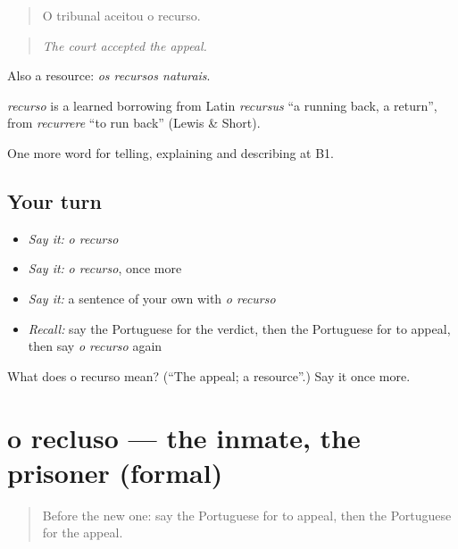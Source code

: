\begin{quote}
O tribunal aceitou o recurso.
\end{quote}

\begin{quote}
\emph{The court accepted the appeal.}
\end{quote}

Also a resource: \emph{os recursos naturais}.

\begin{cousinweb}
\emph{recurso} is a learned borrowing from Latin \emph{recursus} \textquotedblleft{}a running back, a return\textquotedblright{}, from \emph{recurrere} \textquotedblleft{}to run back\textquotedblright{} (Lewis \& Short).
\end{cousinweb}

\begin{grammarlens}[title={What you've built}]
One more word for telling, explaining and describing at B1.
\end{grammarlens}

\subsection*{Your turn}
\begin{itemize}
\raggedright
  \item \emph{Say it:} \emph{o recurso}
  \item \emph{Say it:} \emph{o recurso}, once more
  \item \emph{Say it:} a sentence of your own with \emph{o recurso}
  \item \emph{Recall:} say the Portuguese for the verdict, then the Portuguese for to appeal, then say \emph{o recurso} again
\end{itemize}

\begin{tcolorbox}[breakable,colback=teal!4,colframe=teal!35!black,title={Before you move on}]
What does o recurso mean? (\textquotedblleft{}The appeal; a resource\textquotedblright{}.) Say it once more.
\end{tcolorbox}
\section[o recluso]{o recluso — the inmate, the prisoner (formal)}

\label{lesson:PT-C298-recluso}



\begin{quote}
Before the new one: say the Portuguese for to appeal, then the Portuguese for the appeal.
\end{quote}

